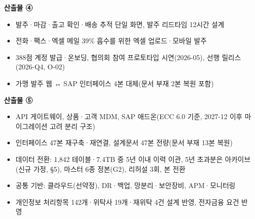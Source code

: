\documentclass[10pt,a4paper]{article}
\begin{document}
\begin{fieldbox}
\textbf{산출물 ④} 
\ifwbblank{}\else
\begin{itemize}
\item 발주·마감·출고 확인·배송 추적 단일 화면, 발주 리드타임 12시간 설계
\item 전화·팩스·엑셀 메일 39\% 흡수를 위한 엑셀 업로드·모바일 발주
\item 388점 계정 발급·온보딩, 협의회 참여 프로토타입 시연(2026-05), 선행 릴리스(2026-Q4, O-02)
\item 가맹 발주 웹 ↔ SAP 인터페이스 4본 대체(문서 부재 2본 복원 포함)
\end{itemize}\fi
\end{fieldbox}
\begin{fieldbox}
\textbf{산출물 ⑤} 
\ifwbblank{}\else
\begin{itemize}
\item API 게이트웨이, 상품·고객 MDM, SAP 애드온(ECC 6.0 기준, 2027-12 이후 마이그레이션 고려 분리 구조)
\item 인터페이스 47본 재구축·재연결, 설계문서 47본 전량(문서 부재 13본 복원)
\item 데이터 전환: 1,842 테이블·7.4TB 중 5년 이내 이력 이관, 5년 초과분은 아카이브(신규 가정, §5), 마스터 6종 정본(G2), 리허설 3회, 본 전환
\item 공통 기반: 클라우드(선약정), DR·백업, 망분리·보안장비, APM·모니터링
\item 개인정보 처리항목 142개·위탁사 19개·재위탁 4건 설계 반영, 전자금융 요건 반영
\end{itemize}\fi
\end{fieldbox}
\end{document}
